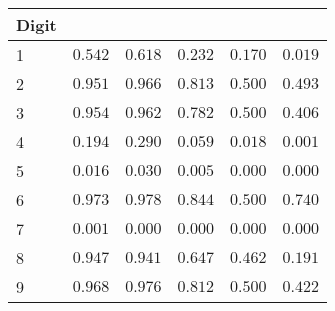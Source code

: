 \begin{table}[!tbp]
\begin{center}
\begin{tabular}{lrrrrr}
\hline\hline
\multicolumn{1}{l}{Digit}&\multicolumn{1}{c}{}&\multicolumn{1}{c}{}&\multicolumn{1}{c}{}&\multicolumn{1}{c}{}&\multicolumn{1}{c}{}\tabularnewline
\hline
1&$0.542$&$0.618$&$0.232$&$0.170$&$0.019$\tabularnewline
2&$0.951$&$0.966$&$0.813$&$0.500$&$0.493$\tabularnewline
3&$0.954$&$0.962$&$0.782$&$0.500$&$0.406$\tabularnewline
4&$0.194$&$0.290$&$0.059$&$0.018$&$0.001$\tabularnewline
5&$0.016$&$0.030$&$0.005$&$0.000$&$0.000$\tabularnewline
6&$0.973$&$0.978$&$0.844$&$0.500$&$0.740$\tabularnewline
7&$0.001$&$0.000$&$0.000$&$0.000$&$0.000$\tabularnewline
8&$0.947$&$0.941$&$0.647$&$0.462$&$0.191$\tabularnewline
9&$0.968$&$0.976$&$0.812$&$0.500$&$0.422$\tabularnewline
\hline
\end{tabular}\end{center}
\end{table}
